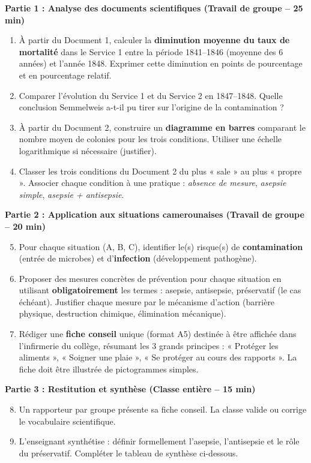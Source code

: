 \documentclass[11pt]{article}
\newcommand{\cle}[1]{{\popxbold\color{popdark}#1}}
\newcounter{popsec}
\newcounter{popsub}
\newcommand{\courssub}[1]{%
  \stepcounter{popsub}%
  \par\vspace{9pt}\noindent{\popxbold\fontsize{11.5}{13}\selectfont\color{popink}{\color{poporange}\thepopsec.\thepopsub}\hspace{6pt}#1}\par\nopagebreak\vspace{4pt}
}
\begin{document}
\courssub{Consignes}

\textbf{Partie 1 : Analyse des documents scientifiques (Travail de groupe -- 25 min)}
\begin{enumerate}
    \item À partir du Document 1, calculer la \textbf{diminution moyenne du taux de mortalité} dans le Service 1 entre la période 1841--1846 (moyenne des 6 années) et l'année 1848. Exprimer cette diminution en points de pourcentage et en pourcentage relatif.
    \item Comparer l'évolution du Service 1 et du Service 2 en 1847--1848. Quelle conclusion Semmelweis a-t-il pu tirer sur l'origine de la contamination ?
    \item À partir du Document 2, construire un \textbf{diagramme en barres} comparant le nombre moyen de colonies pour les trois conditions. Utiliser une échelle logarithmique si nécessaire (justifier).
    \item Classer les trois conditions du Document 2 du plus « sale » au plus « propre ». Associer chaque condition à une pratique : \emph{absence de mesure}, \emph{asepsie simple}, \emph{asepsie + antisepsie}.
\end{enumerate}

\textbf{Partie 2 : Application aux situations camerounaises (Travail de groupe -- 20 min)}
\begin{enumerate}\setcounter{enumi}{4}
    \item Pour chaque situation (A, B, C), identifier le(s) risque(s) de \textbf{contamination} (entrée de microbes) et d'\textbf{infection} (développement pathogène).
    \item Proposer des mesures concrètes de prévention pour chaque situation en utilisant \textbf{obligatoirement} les termes : \cle{asepsie}, \cle{antisepsie}, \cle{préservatif} (le cas échéant). Justifier chaque mesure par le mécanisme d'action (barrière physique, destruction chimique, élimination mécanique).
    \item Rédiger une \textbf{fiche conseil} unique (format A5) destinée à être affichée dans l'infirmerie du collège, résumant les 3 grands principes : « Protéger les aliments », « Soigner une plaie », « Se protéger au cours des rapports ». La fiche doit être illustrée de pictogrammes simples.
\end{enumerate}

\textbf{Partie 3 : Restitution et synthèse (Classe entière -- 15 min)}
\begin{enumerate}\setcounter{enumi}{7}
    \item Un rapporteur par groupe présente sa fiche conseil. La classe valide ou corrige le vocabulaire scientifique.
    \item L'enseignant synthétise : définir formellement l'asepsie, l'antisepsie et le rôle du préservatif. Compléter le tableau de synthèse ci-dessous.
\end{enumerate}
\end{document}
